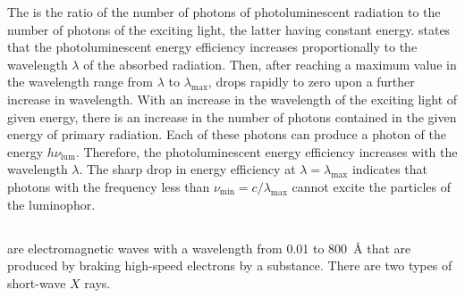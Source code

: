 The  is the ratio of the number of photons of photoluminescent radiation to the number of photons of the exciting light, the latter having constant energy.  states that the photoluminescent energy efficiency increases proportionally to the wavelength $\lambda$ of the absorbed radiation. Then,
after reaching a maximum value in the wavelength range from $\lambda$ to $\lambda_{\mathrm{max}}$, drops rapidly to zero upon a further increase in wavelength. With an increase in the wavelength of the exciting light of given energy, there is an increase in the number of photons contained in the given energy of primary radiation. Each of these photons can produce a photon of the energy $h \nu_{\mathrm{lum}}$. Therefore, the photoluminescent energy efficiency increases with the wavelength $\lambda$. The sharp drop in energy efficiency at $\lambda = \lambda_{\mathrm{max}}$ indicates that photons with the frequency less than $\nu_{\mathrm{min}} = c /\lambda_{\mathrm{max}}$ cannot excite the particles of the luminophor.

\subsection{}\label{39.7.7}  are electromagnetic waves with a wavelength from 0.01 to \SI{800}{\angstrom} that are produced by braking high-speed electrons by a substance. There are two types of short-wave $X$ rays.

